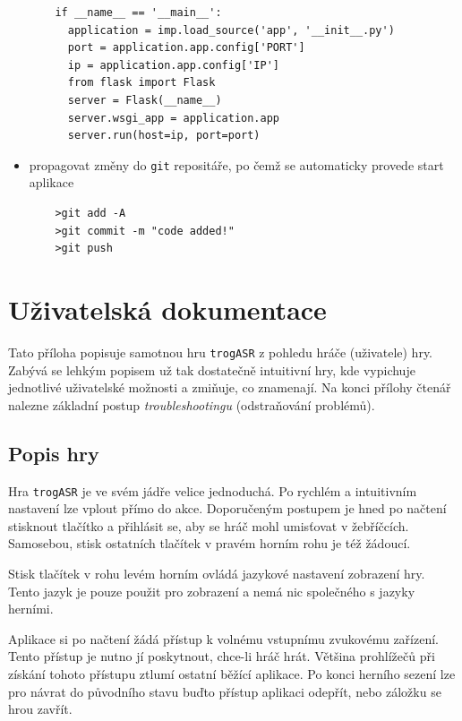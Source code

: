 \begin{itemize}
\begin{verbatim}
	if __name__ == '__main__':
	  application = imp.load_source('app', '__init__.py')
	  port = application.app.config['PORT']
	  ip = application.app.config['IP']
	  from flask import Flask
	  server = Flask(__name__)
	  server.wsgi_app = application.app
	  server.run(host=ip, port=port)
	\end{verbatim}
\newpage
\item propagovat změny do \verb|git| repositáře, po čemž se automaticky provede start aplikace
	\begin{verbatim}
	>git add -A
	>git commit -m "code added!"
	>git push
	\end{verbatim}
\end{itemize}

\chapter{Uživatelská dokumentace}

Tato příloha popisuje samotnou hru \verb|trogASR| z pohledu hráče (uživatele) hry. Zabývá se lehkým popisem už tak dostatečně intuitivní hry, kde vypichuje jednotlivé uživatelské možnosti a zmiňuje, co znamenají. Na konci přílohy čtenář nalezne základní postup {\sl troubleshootingu} (odstraňování problémů).

\section{Popis hry}

Hra \verb|trogASR| je ve svém jádře velice jednoduchá. Po rychlém a intuitivním nastavení lze vplout přímo do akce. Doporučeným postupem je hned po načtení stisknout tlačítko  a přihlásit se, aby se hráč mohl umisťovat v žebříčcích. Samosebou, stisk ostatních tlačítek v pravém horním rohu je též žádoucí.

Stisk tlačítek v rohu levém horním ovládá jazykové nastavení zobrazení hry. Tento jazyk je pouze použit pro zobrazení a nemá nic společného s jazyky herními.

Aplikace si po načtení žádá přístup k volnému vstupnímu zvukovému zařízení. Tento přístup je nutno jí poskytnout, chce-li hráč hrát. Většina prohlížečů při získání tohoto přístupu ztlumí ostatní běžící aplikace. Po konci herního sezení lze pro návrat do původního stavu buďto přístup aplikaci odepřít, nebo záložku se hrou zavřít.

